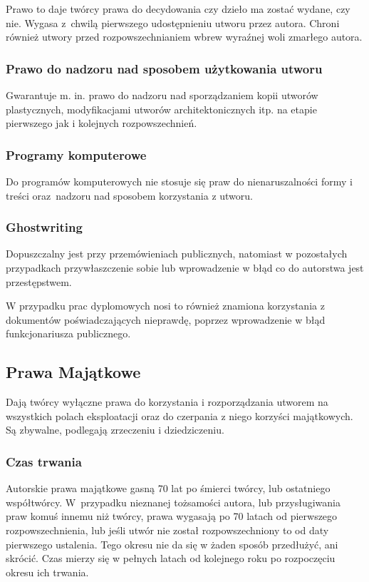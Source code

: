 \documentclass{article}
\begin{document}
Prawo to daje twórcy prawa do decydowania czy dzieło ma zostać wydane, czy nie. Wygasa z~chwilą pierwszego udostępnieniu utworu przez autora. Chroni również utwory przed rozpowszechnianiem wbrew wyraźnej woli zmarłego autora.

\subsubsection{Prawo do nadzoru nad sposobem użytkowania utworu}

Gwarantuje m. in. prawo do nadzoru nad sporządzaniem kopii utworów plastycznych, modyfikacjami utworów architektonicznych itp. na etapie pierwszego jak i kolejnych rozpowszechnień.

\subsubsection{Programy komputerowe}

Do programów komputerowych nie stosuje się praw do nienaruszalności formy i treści oraz~nadzoru nad sposobem korzystania z utworu.

\subsubsection{Ghostwriting}

Dopuszczalny jest przy przemówieniach publicznych, natomiast w pozostałych przypadkach przywłaszczenie sobie lub wprowadzenie w błąd co do autorstwa jest przestępstwem.

W przypadku prac dyplomowych nosi to również znamiona korzystania z dokumentów poświadczających nieprawdę, poprzez wprowadzenie w błąd funkcjonariusza publicznego.

\subsection{Prawa Majątkowe}

Dają twórcy wyłączne prawa do korzystania i rozporządzania utworem na wszystkich polach eksploatacji oraz do czerpania z niego korzyści majątkowych. Są zbywalne, podlegają zrzeczeniu i dziedziczeniu.

\subsubsection{Czas trwania}

Autorskie prawa majątkowe gasną 70 lat po śmierci twórcy, lub ostatniego współtwórcy.
W~przypadku nieznanej tożsamości autora, lub przysługiwania praw komuś innemu niż twórcy, prawa wygasają po 70 latach od pierwszego rozpowszechnienia, lub jeśli utwór nie został rozpowszechniony to od daty pierwszego ustalenia. Tego okresu nie da się w żaden sposób przedłużyć, ani skrócić. Czas mierzy się w pełnych latach od kolejnego roku po rozpoczęciu okresu ich trwania.
\end{document}
